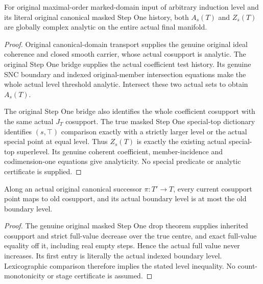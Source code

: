 \begin{lemma}
\label{hir:original-step-one-history-analytic-baseline-reset}
\leanok
{}
For original maximal-order marked-domain input of arbitrary induction level
and its literal original canonical masked Step One history, both $A_s(T)$
and $Z_s(T)$ are globally complex analytic on the entire actual final manifold.
\end{lemma}
\begin{proof}
Original canonical-domain transport supplies the genuine original ideal
coherence and closed smooth carrier, whose actual cosupport is analytic.
The original Step One bridge supplies the actual coefficient test history.
Its genuine SNC boundary and indexed original-member intersection equations
make the whole actual level threshold analytic. Intersect these two actual
sets to obtain $A_s(T)$.

The original Step One bridge also identifies the whole coefficient
cosupport with the same actual $J_T$ cosupport. The true masked Step One
special-top dictionary identifies $(s,\top)$ comparison exactly with a
strictly larger level or the actual special point at equal level. Thus
$Z_s(T)$ is exactly the existing actual special-top superlevel. Its genuine
coherent coefficient, member-incidence and codimension-one equations give
analyticity. No special predicate or analytic certificate is supplied.
\end{proof}

\begin{lemma}
\label{hir:original-step-one-history-canonical-successor-level-bound}
\leanok
{}
Along an actual original canonical successor $\pi:T'\to T$, every current
cosupport point maps to old cosupport, and its actual boundary level is at
most the old boundary level.
\end{lemma}
\begin{proof}
The genuine original masked Step One drop theorem supplies inherited
cosupport and strict full-value decrease over the true centre, and exact
full-value equality off it, including real empty steps. Hence the actual
full value never increases. Its first entry is literally the actual indexed
boundary level. Lexicographic comparison therefore implies the stated
level inequality. No count-monotonicity or stage certificate is assumed.
\end{proof}

